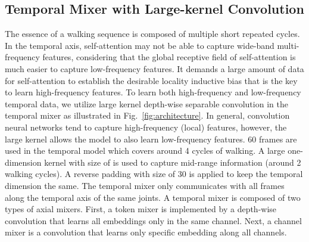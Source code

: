 \documentclass{article}
\begin{document}
 

\subsection{Temporal Mixer with Large-kernel Convolution} 
The essence of a walking sequence is composed of multiple short repeated cycles. In the temporal axis, self-attention may not be able to capture wide-band multi-frequency features, considering that the global receptive field of self-attention is much easier to capture low-frequency features. It demands a large amount of data for self-attention to establish the desirable locality inductive bias that is the key to learn high-frequency features. To learn both high-frequency and low-frequency temporal data, we utilize large kernel depth-wise separable convolution in the temporal mixer as illustrated in Fig.~\ref{fig:architecture}. In general, convolution neural networks tend to capture high-frequency (local) features, however, the large kernel allows the model to also learn low-frequency features. 60 frames are used in the temporal model which covers around 4 cycles of walking. A large one-dimension kernel with size of  is used to capture mid-range information (around 2 walking cycles). A reverse padding with size of 30 is applied to keep the temporal dimension the same. The temporal mixer only communicates with all frames along the temporal axis of the same joints. A temporal mixer is composed of two types of axial mixers. First, a token mixer is implemented by a depth-wise convolution that learns all embeddings only in the same channel. Next, a channel mixer is a  convolution that learns only specific embedding along all channels.
\end{document}
